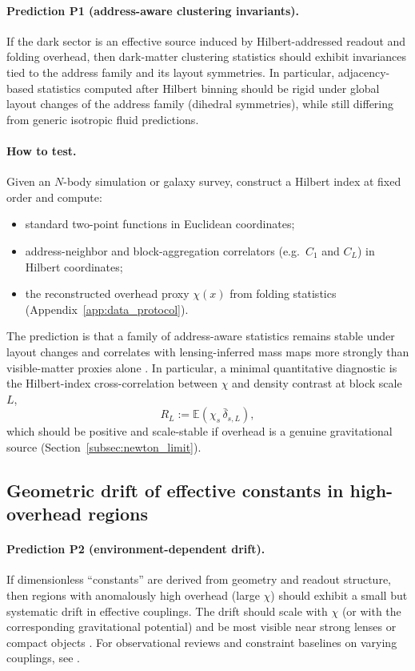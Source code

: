 \paragraph{Prediction P1 (address-aware clustering invariants).}
If the dark sector is an effective source induced by Hilbert-addressed readout and folding overhead, then dark-matter clustering statistics should exhibit invariances tied to the address family and its layout symmetries.
In particular, adjacency-based statistics computed after Hilbert binning should be rigid under global layout changes of the address family (dihedral symmetries), while still differing from generic isotropic fluid predictions.

\paragraph{How to test.}
Given an $N$-body simulation or galaxy survey, construct a Hilbert index at fixed order and compute:
\begin{itemize}
\item standard two-point functions in Euclidean coordinates;
\item address-neighbor and block-aggregation correlators (e.g.\ $C_1$ and $C_L$) in Hilbert coordinates;
\item the reconstructed overhead proxy $\chi(x)$ from folding statistics (Appendix~\ref{app:data_protocol}).
\end{itemize}
The prediction is that a family of address-aware statistics remains stable under layout changes and correlates with lensing-inferred mass maps more strongly than visible-matter proxies alone \cite{BartelmannSchneider2001}.
In particular, a minimal quantitative diagnostic is the Hilbert-index cross-correlation between $\chi$ and density contrast at block scale $L$,
\[
R_L:=\mathbb{E}\!\left(\chi_s\,\bar{\delta}_{s,L}\right),
\]
which should be positive and scale-stable if overhead is a genuine gravitational source (Section~\ref{subsec:newton_limit}).

\subsection{Geometric drift of effective constants in high-overhead regions}
\label{subsec:test_constants_drift}

\paragraph{Prediction P2 (environment-dependent drift).}
If dimensionless ``constants'' are derived from geometry and readout structure, then regions with anomalously high overhead (large $\chi$) should exhibit a small but systematic drift in effective couplings.
The drift should scale with $\chi$ (or with the corresponding gravitational potential) and be most visible near strong lenses or compact objects \cite{Ma2025PCG}.
For observational reviews and constraint baselines on varying couplings, see \cite{Uzan2011}.

